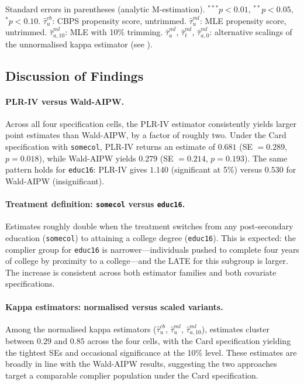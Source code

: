 \documentclass[12pt]{article}
\begin{document}
\begin{table}[htbp]
\begin{threeparttable}
\begin{tablenotes}[flushleft]
      \item Standard errors in parentheses (analytic M-estimation).
            $^{***}p<0.01$, $^{**}p<0.05$, $^{*}p<0.10$.
            $\hat{\tau}^{cb}_{u}$: CBPS propensity score, untrimmed.
            $\hat{\tau}^{ml}_{u}$: MLE propensity score, untrimmed.
            $\hat{\tau}^{ml}_{a,10}$: MLE with 10\% trimming.
            $\hat{\tau}^{ml}_{a}$, $\hat{\tau}^{ml}_{t}$,
            $\hat{\tau}^{ml}_{a,0}$: alternative scalings of the
            unnormalised kappa estimator (see \citealt{sloczynskietal2025}).
    \end{tablenotes}
  \end{threeparttable}
\end{table}

\subsection*{Discussion of Findings}

\paragraph{PLR-IV versus Wald-AIPW.}
Across all four specification cells, the PLR-IV estimator
consistently yields larger point estimates than Wald-AIPW,
by a factor of roughly two. Under the Card specification with
\texttt{somecol}, PLR-IV returns an estimate of $0.681$
(SE $= 0.289$, $p = 0.018$), while Wald-AIPW yields $0.279$
(SE $= 0.214$, $p = 0.193$). The same pattern holds for
\texttt{educ16}: PLR-IV gives $1.140$ (significant at 5\%)
versus $0.530$ for Wald-AIPW (insignificant). 



\paragraph{Treatment definition: \texttt{somecol} versus \texttt{educ16}.}
Estimates roughly double when the treatment switches from
any post-secondary education (\texttt{somecol}) to attaining
a college degree (\texttt{educ16}). This is expected: the
complier group for \texttt{educ16} is narrower---individuals
pushed to complete four years of college by proximity to a
college---and the LATE for this subgroup is larger. The
increase is consistent across both estimator families and
both covariate specifications.

\paragraph{Kappa estimators: normalised versus scaled variants.}
Among the normalised kappa estimators
($\hat{\tau}^{cb}_{u}$, $\hat{\tau}^{ml}_{u}$,
$\hat{\tau}^{ml}_{a,10}$), estimates cluster between $0.29$
and $0.85$ across the four cells, with the Card specification
yielding the tightest SEs and occasional significance at the
10\% level. These estimates are broadly in line with the
Wald-AIPW results, suggesting the two approaches target a
comparable complier population under the Card specification.
\end{document}
